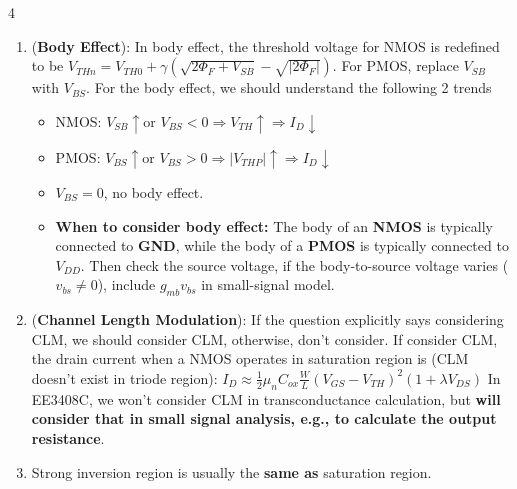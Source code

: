 \documentclass[10pt, landscape]{article}
\begin{document}
\begin{multicols}{4}
\begin{enumerate}
\begin{itemize}
\begin{itemize}
        \end{itemize}
        \item (\textbf{Linear Region}): For NMOS operating in \textbf{linear region}, $g_m=\mu_n C_{ox} \frac{W}{L} V_{DS}$.
    \end{itemize}
    \item (\textbf{Body Effect}): In body effect, the threshold voltage for NMOS is redefined to be $V_{THn} = V_{TH0} + \gamma \left( \sqrt{2\Phi_F + V_{SB}} - \sqrt{|2\Phi_F|} \right)$. For PMOS, replace $V_{SB}$ with $V_{BS}$. For the body effect, we should understand the following 2 trends
    \begin{itemize}
        \item NMOS: $V_{SB}\uparrow \text{or } V_{BS}<0\Rightarrow V_{TH}\uparrow\Rightarrow I_D\downarrow$
        \item PMOS: $V_{BS}\uparrow \text{or } V_{BS}>0\Rightarrow |V_{THP}|\uparrow\Rightarrow I_D\downarrow$
        \item $V_{BS}=0$, no body effect.
        \item \textbf{When to consider body effect:} The body of an \textbf{NMOS} is typically connected to \textbf{GND}, while the body of a \textbf{PMOS} is typically connected to $V_{DD}$. Then check the source voltage, if the body-to-source voltage varies ($v_{bs}\neq 0$), include $g_{mb}v_{bs}$ in small-signal model.
    \end{itemize}
    \item (\textbf{Channel Length Modulation}): If the question explicitly says considering CLM, we should consider CLM, otherwise, don't consider. If consider CLM, the drain current when a NMOS operates in saturation region is (CLM doesn't exist in triode region):
    $I_D \approx \frac{1}{2}\mu_n C_{ox}\frac{W}{L}(V_{GS}-V_{TH})^2(1+\lambda V_{DS})$
    In EE3408C, we won't consider CLM in transconductance calculation, but \textbf{will consider that in small signal analysis, e.g., to calculate the output resistance}.
    \item Strong inversion region is usually the \textbf{same as} saturation region.
\end{enumerate}


\end{multicols}
\end{document}
